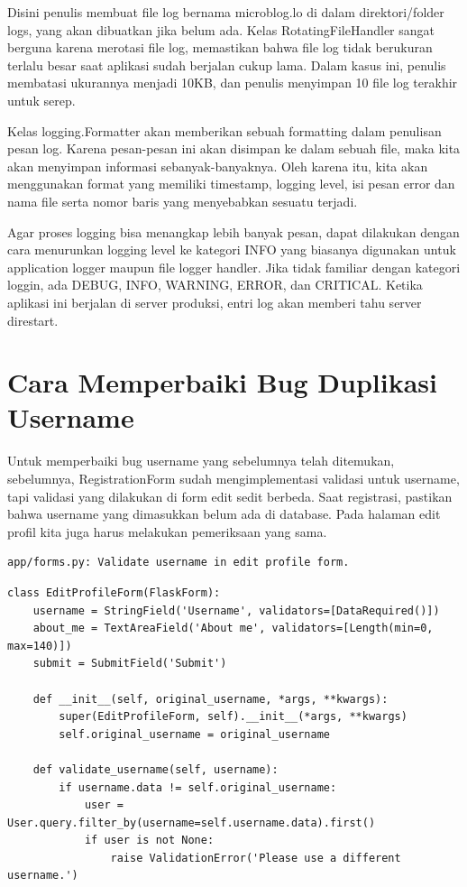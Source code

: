 Disini penulis membuat file log bernama microblog.lo di dalam direktori/folder logs, yang akan dibuatkan jika belum ada. Kelas RotatingFileHandler sangat berguna karena merotasi file log, memastikan bahwa file log tidak berukuran terlalu besar saat aplikasi sudah berjalan cukup lama. Dalam kasus ini, penulis membatasi ukurannya menjadi 10KB, dan penulis menyimpan 10 file log terakhir untuk serep. 

Kelas logging.Formatter akan memberikan sebuah formatting dalam penulisan pesan log. Karena pesan-pesan ini akan disimpan ke dalam sebuah file, maka kita akan menyimpan informasi sebanyak-banyaknya. Oleh karena itu, kita akan menggunakan format yang memiliki timestamp, logging level, isi pesan error dan nama file serta nomor baris yang menyebabkan sesuatu terjadi.

Agar proses logging bisa menangkap lebih banyak pesan, dapat dilakukan dengan cara menurunkan logging level ke kategori INFO yang biasanya digunakan untuk application logger maupun file logger handler. Jika tidak familiar dengan kategori loggin, ada DEBUG, INFO, WARNING, ERROR, dan CRITICAL.  Ketika aplikasi ini berjalan di server produksi, entri log akan memberi tahu server direstart.


\section{Cara Memperbaiki Bug Duplikasi Username}
Untuk memperbaiki bug username yang sebelumnya telah ditemukan, sebelumnya, RegistrationForm sudah mengimplementasi validasi untuk username, tapi validasi yang dilakukan di form edit sedit berbeda. Saat registrasi, pastikan bahwa username yang dimasukkan belum ada di database. Pada halaman edit profil kita juga harus melakukan pemeriksaan yang sama.
\begin{verbatim}
app/forms.py: Validate username in edit profile form.
\end{verbatim}

\begin{verbatim}
class EditProfileForm(FlaskForm):
    username = StringField('Username', validators=[DataRequired()])
    about_me = TextAreaField('About me', validators=[Length(min=0, max=140)])
    submit = SubmitField('Submit')

    def __init__(self, original_username, *args, **kwargs):
        super(EditProfileForm, self).__init__(*args, **kwargs)
        self.original_username = original_username

    def validate_username(self, username):
        if username.data != self.original_username:
            user = User.query.filter_by(username=self.username.data).first()
            if user is not None:
                raise ValidationError('Please use a different username.')
\end{verbatim}

